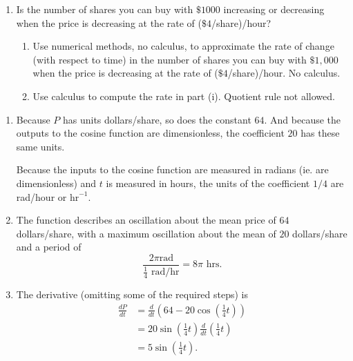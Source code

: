 \documentclass{ximera}
\begin{document}
\begin{question}
\begin{enumerate}

\item Is the number of shares you can buy with $\$1000$ increasing or decreasing when the price is decreasing at the rate of ($\$4$/share)/hour? 

\begin{enumerate}

\item Use numerical methods, no calculus, to approximate the rate of change (with respect to time) in the number of shares you can buy with $\$1,000$ when the price is decreasing at the rate of ($\$4$/share)/hour. No calculus.

\item Use calculus to compute the rate in part (i). Quotient rule not allowed.

\end{enumerate}
\end{enumerate}

\begin{explanation}
\begin{enumerate}
\item Because $P$ has units dollars/share, so does the constant $64$. And because the outputs to the cosine function are dimensionless, the coefficient $20$ has these same units.

Because the inputs to the cosine function are measured in radians (ie. are dimensionless) and $t$ is measured in hours, the units 
of the coefficient $1/4$ are rad/hour or $\text{hr}^{-1}$.

\item The function describes an oscillation about the mean price of $64$ dollars/share, with a maximum oscillation about the mean of $20$ dollars/share and a period of 
\[
  \frac{2\pi \text{rad}}{\frac{1}{4}\text{ rad/hr}} = 8\pi \text{ hrs}.
\]

\item The derivative (omitting some of the required steps) is
\begin{align*}
 \frac{dP}{dt} &= \frac{d}{dt} \left(  64 - 20\cos\left(  \frac{1}{4} t \right)\right) \\
                    &= 20\sin \left(  \frac{1}{4} t \right) \frac{d}{dt}\left( \frac{1}{4}t  \right) \\
                    &= 5 \sin \left(  \frac{1}{4} t \right) .
\end{align*}


\end{enumerate}
\end{explanation}
\end{question}
\end{document}
